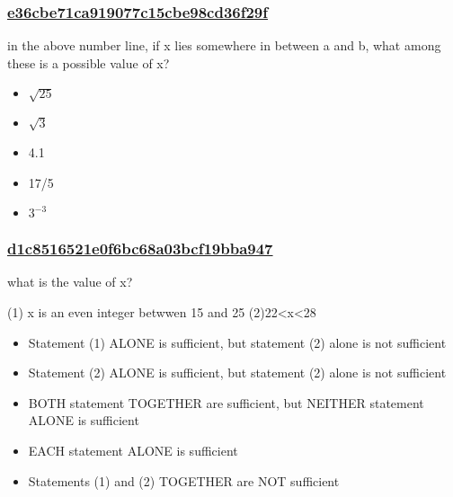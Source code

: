 \documentclass[]{beamer}
\begin{document}
\begin{frame}
    \frametitle{\underline{e36cbe71ca919077c15cbe98cd36f29f}}
    in the above number line, if x lies somewhere in between a and b, what among these is a possible value of x?    
    \begin{itemize}
        \item
            $\sqrt{25}$
        \item
            $\sqrt{3}$
        \item
            4.1
        \item
            17/5
        \item
            $3^{-3}$
    \end{itemize}
\end{frame}

\begin{frame}
    \frametitle{\underline{d1c8516521e0f6bc68a03bcf19bba947}}
    what is the value of x?\par
(1) x is an even integer betwwen 15 and 25
(2)22<x<28    
    \begin{itemize}
        \item
            Statement (1) ALONE is sufficient, but statement (2) alone is not sufficient
        \item
            Statement (2) ALONE is sufficient, but statement (2) alone is not sufficient
        \item
            BOTH statement TOGETHER are sufficient, but NEITHER statement ALONE is sufficient
        \item
            EACH statement ALONE is sufficient
        \item
            Statements (1) and (2) TOGETHER are NOT sufficient
    \end{itemize}
\end{frame}
\end{document}
